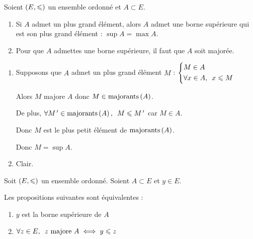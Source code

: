 \begin{prop}
Soient \(\left(E,\leqslant\right)\) un ensemble ordonné et \(A\subset E\).

\begin{enumerate}
\item Si \(A\) admet un plus grand élément, alors \(A\) admet une borne supérieure qui est son plus grand élément : \(\sup A=\max A\).

\item Pour que \(A\) admettes une borne supérieure, il faut que \(A\) soit majorée.
\end{enumerate}
\end{prop}

\begin{dem}
\begin{enumerate}
\item Supposons que \(A\) admet un plus grand élément \(M\) : \(\begin{dcases}M\in A \\ \quantifs{\forall x\in A}x\leq M\end{dcases}\)

Alors \(M\) majore \(A\) donc \(M\in\mathrm{majorants}\left(A\right)\).

De plus, \(\quantifs{\forall M\prim\in\majo{A}}M\leq M\prim\) car \(M\in A\).

Donc \(M\) est le plus petit élément de \(\mathrm{majorants}\left(A\right)\).

Donc \(M=\sup A\).

\item Clair.
\end{enumerate}
\end{dem}

\begin{prop}
Soit \(\left(E,\leqslant\right)\) un ensemble ordonné. Soient \(A\subset E\) et \(y\in E\).

Les propositions suivantes sont équivalentes : \begin{enumerate}
\item \(y\) est la borne supérieure de \(A\)

\item \(\quantifs{\forall z\in E}z\text{ majore }A\iff y\leq z\)
\end{enumerate}
\end{prop}

